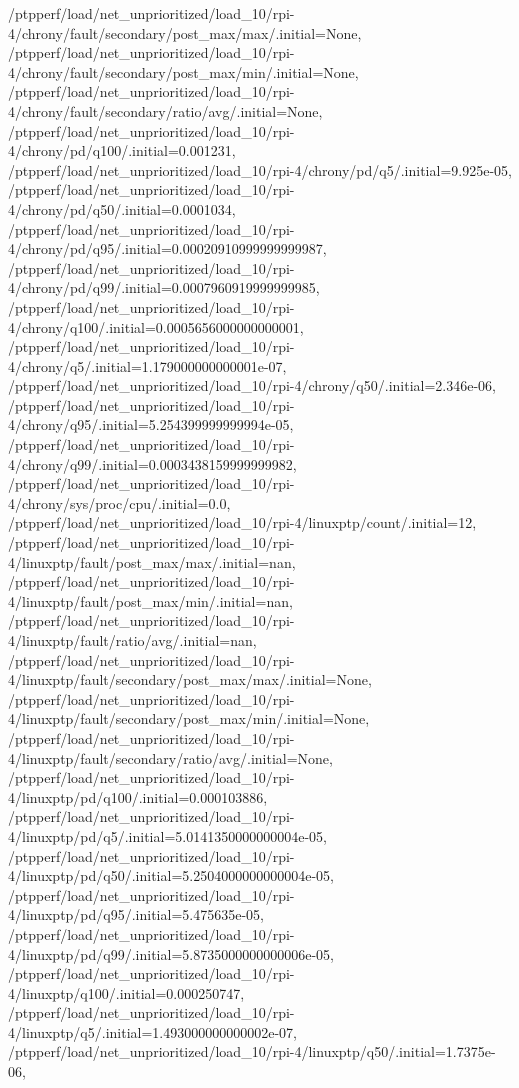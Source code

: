 {    /ptpperf/load/net_unprioritized/load_10/rpi-4/chrony/fault/secondary/post_max/max/.initial=None,
    /ptpperf/load/net_unprioritized/load_10/rpi-4/chrony/fault/secondary/post_max/min/.initial=None,
    /ptpperf/load/net_unprioritized/load_10/rpi-4/chrony/fault/secondary/ratio/avg/.initial=None,
    /ptpperf/load/net_unprioritized/load_10/rpi-4/chrony/pd/q100/.initial=0.001231,
    /ptpperf/load/net_unprioritized/load_10/rpi-4/chrony/pd/q5/.initial=9.925e-05,
    /ptpperf/load/net_unprioritized/load_10/rpi-4/chrony/pd/q50/.initial=0.0001034,
    /ptpperf/load/net_unprioritized/load_10/rpi-4/chrony/pd/q95/.initial=0.00020910999999999987,
    /ptpperf/load/net_unprioritized/load_10/rpi-4/chrony/pd/q99/.initial=0.0007960919999999985,
    /ptpperf/load/net_unprioritized/load_10/rpi-4/chrony/q100/.initial=0.0005656000000000001,
    /ptpperf/load/net_unprioritized/load_10/rpi-4/chrony/q5/.initial=1.179000000000001e-07,
    /ptpperf/load/net_unprioritized/load_10/rpi-4/chrony/q50/.initial=2.346e-06,
    /ptpperf/load/net_unprioritized/load_10/rpi-4/chrony/q95/.initial=5.254399999999994e-05,
    /ptpperf/load/net_unprioritized/load_10/rpi-4/chrony/q99/.initial=0.0003438159999999982,
    /ptpperf/load/net_unprioritized/load_10/rpi-4/chrony/sys/proc/cpu/.initial=0.0,
    /ptpperf/load/net_unprioritized/load_10/rpi-4/linuxptp/count/.initial=12,
    /ptpperf/load/net_unprioritized/load_10/rpi-4/linuxptp/fault/post_max/max/.initial=nan,
    /ptpperf/load/net_unprioritized/load_10/rpi-4/linuxptp/fault/post_max/min/.initial=nan,
    /ptpperf/load/net_unprioritized/load_10/rpi-4/linuxptp/fault/ratio/avg/.initial=nan,
    /ptpperf/load/net_unprioritized/load_10/rpi-4/linuxptp/fault/secondary/post_max/max/.initial=None,
    /ptpperf/load/net_unprioritized/load_10/rpi-4/linuxptp/fault/secondary/post_max/min/.initial=None,
    /ptpperf/load/net_unprioritized/load_10/rpi-4/linuxptp/fault/secondary/ratio/avg/.initial=None,
    /ptpperf/load/net_unprioritized/load_10/rpi-4/linuxptp/pd/q100/.initial=0.000103886,
    /ptpperf/load/net_unprioritized/load_10/rpi-4/linuxptp/pd/q5/.initial=5.0141350000000004e-05,
    /ptpperf/load/net_unprioritized/load_10/rpi-4/linuxptp/pd/q50/.initial=5.2504000000000004e-05,
    /ptpperf/load/net_unprioritized/load_10/rpi-4/linuxptp/pd/q95/.initial=5.475635e-05,
    /ptpperf/load/net_unprioritized/load_10/rpi-4/linuxptp/pd/q99/.initial=5.8735000000000006e-05,
    /ptpperf/load/net_unprioritized/load_10/rpi-4/linuxptp/q100/.initial=0.000250747,
    /ptpperf/load/net_unprioritized/load_10/rpi-4/linuxptp/q5/.initial=1.493000000000002e-07,
    /ptpperf/load/net_unprioritized/load_10/rpi-4/linuxptp/q50/.initial=1.7375e-06,
}

